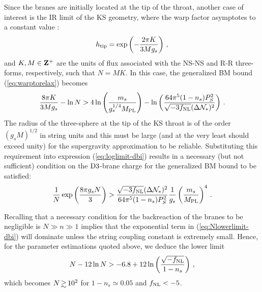 Since the branes are initially located at the tip of the 
throat, another case of interest is the IR limit of the KS geometry, where 
the warp factor asymptotes to a constant value 
\cite{gkp}:
% 
\begin{equation}
\label{eq:KStip-dbi}
h_{\rm tip} = \exp \left( - \frac{2\pi K}{3Mg_s} \right) \,,
\end{equation}
% 
and $K,M \in {\rm \bf Z^+}$ are the units of flux associated 
with the NS-NS and R-R three-forms, respectively, such that $N=MK$.
In this case, the generalized BM bound (\ref{eq:warptorelax}) becomes
%  
\begin{equation}
\label{eq:loglimit-dbi}
\frac{8\pi K}{3Mg_s} -\ln N > 4 \ln \left( \frac{m_s}{g_s^{1/4}M_{\mathrm{PL}}} \right)
-\ln \left( 
\frac{64\pi^5 (1-n_s)P_S^2}{\sqrt{-3f_{\mathrm{NL}}} ( \Delta {\cal{N}}_*)^2}
\right) \,.
\end{equation}
% 
The radius of the three-sphere at the tip of the KS 
throat is of the order $(g_sM)^{1/2}$ in string units 
and this must be large (and at the very least should exceed
unity) for the supergravity approximation to be reliable. 
Substituting this requirement into expression (\ref{eq:loglimit-dbi}) 
results in a necessary (but not sufficient) condition 
on the ${\rm D3}$-brane charge for the 
generalized BM bound to be satisfied:
%  
\begin{equation}
\label{eq:Nlowerlimit-dbi}
\frac{1}{N} \exp \left( \frac{8\pi g_s N}{3}  \right)
> \frac{\sqrt{-3f_{\mathrm{NL}}} ( \Delta {\cal{N}}_*)^2}{64\pi^5 
(1-n_s)P_S^2} \frac{1}{g_s} \left( \frac{m_s}{M_{\mathrm{PL}}} \right)^4 \,.
\end{equation}
% 


Recalling that a necessary condition for the backreaction 
of the branes to be negligible is 
$N \gg n \gg 1$ implies that the 
exponential term in (\ref{eq:Nlowerlimit-dbi}) will dominate unless 
the string coupling constant is extremely small. Hence, for 
the parameter estimations quoted above, we 
deduce the lower limit 
% 
\begin{equation}
\label{eq:Nconstraint-dbi}
N- 12 \ln N > -6.8 +12 \ln \left( \frac{\sqrt{-f_{\mathrm{NL}}}}{1-n_s} \right) \,,
\end{equation}
% 
which becomes $N \, \gsim \, 10^2$ for $1-n_s \simeq 0.05$ and $f_{\mathrm{NL}}<-5$.


